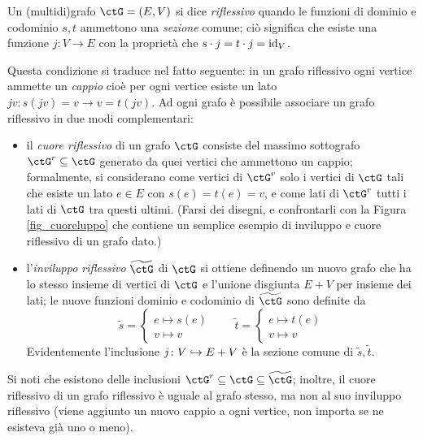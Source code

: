 \begin{example}\label{ex_grafi_refl}
 Un (multidi)grafo \(\ctG=(E,V)\) si dice \emph{riflessivo} quando le funzioni di dominio e codominio \(s,t\) ammettono una \emph{sezione} comune; ciò significa che esiste una funzione \(j \colon V \to E\) con la proprietà che \(s\cdot j = t\cdot j = \mathrm{id}_V\).

 Questa condizione si traduce nel fatto seguente: in un grafo riflessivo ogni vertice ammette un \emph{cappio} cioè per ogni vertice esiste un lato \(jv \colon s(jv)=v \to v=t(jv)\). Ad ogni grafo è possibile associare un grafo riflessivo in due modi complementari:
 \begin{itemize}
  \item il \emph{cuore riflessivo} di un grafo \(\ctG\) consiste del massimo sottografo \(\ctG^r \subseteq\ctG\) generato da quei vertici che ammettono un cappio; formalmente, si considerano come vertici di \(\ctG^r\) solo i vertici di \(\ctG\) tali che esiste un lato \(e\in E\) con \(s(e)=t(e)=v\), e come lati di \(\ctG^r\) tutti i lati di \(\ctG\) tra questi ultimi. (Farsi dei disegni, e confrontarli con la Figura \ref{fig_cuoreluppo} che contiene un semplice esempio di inviluppo e cuore riflessivo di un grafo dato.)
  \item l'\emph{inviluppo riflessivo} \(\widetilde{\ctG}\) di \(\ctG\) si ottiene definendo un nuovo grafo che ha lo stesso insieme di vertici di \(\ctG\) e l'unione disgiunta \(E+V\) per insieme dei lati; le nuove funzioni dominio e codominio di \(\widetilde\ctG\) sono definite da
        \[\tilde s = \begin{cases}
          e \mapsto s(e) \\
          v \mapsto v
         \end{cases} \qquad
         \tilde t = \begin{cases}
          e \mapsto t(e) \\
          v \mapsto v
         \end{cases}\]
        Evidentemente l'inclusione \(j \colon V \hookrightarrow E+V\) è la sezione comune di \(\tilde s,\tilde t\).
 \end{itemize}
 Si noti che esistono delle inclusioni \(\ctG^r \subseteq\ctG \subseteq \widetilde\ctG\); inoltre, il cuore riflessivo di un grafo riflessivo è uguale al grafo stesso, ma non al suo inviluppo riflessivo (viene aggiunto un nuovo cappio a ogni vertice, non importa se ne esisteva già uno o meno).


\end{example}
